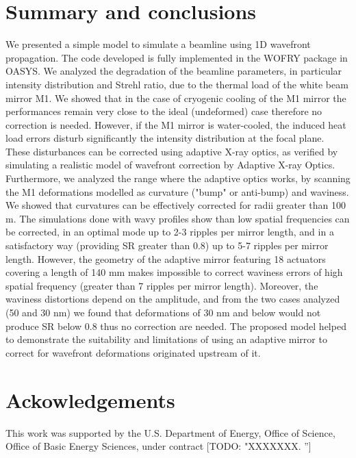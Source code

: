\documentclass[preprint]{iucr}              %
\newcommand{\todo}[1]{{\color{red}[TODO: "#1'']}}
\begin{document}
  

\section{Summary and conclusions}
\label{sec:summary}

We presented a simple model to simulate a beamline using 1D wavefront propagation. The code developed is fully implemented in the WOFRY package in OASYS.
We analyzed the degradation of the beamline parameters, in particular intensity distribution and Strehl ratio, due to the thermal load of the white beam mirror M1. We showed that in the case of cryogenic cooling of the M1 mirror the performances remain very close to the ideal (undeformed) case therefore no correction is needed. However, if the M1 mirror is water-cooled, the induced heat load errors disturb significantly the intensity distribution at the focal plane. These disturbances can be corrected using adaptive X-ray optics, as verified by simulating a realistic model of wavefront correction by Adaptive X-ray Optics. Furthermore, we analyzed the range where the adaptive optics works, by scanning the M1 deformations modelled as curvature ("bump" or anti-bump) and waviness. We showed that curvatures can be effectively corrected for radii greater than 100 m. The simulations done with wavy profiles show than low spatial frequencies can be corrected, in an optimal mode up to 2-3 ripples per mirror length, and in a satisfactory way (providing SR greater than 0.8) up to 5-7 ripples per mirror length. However, the geometry of the adaptive mirror featuring 18 actuators covering a length of 140 mm makes impossible to correct waviness errors of high spatial frequency (greater than 7 ripples per mirror length). Moreover, the waviness distortions depend on the amplitude, and from the two cases analyzed (50 and 30 nm) we found that deformations of 30 nm and below would not produce SR below 0.8 thus no correction are needed. The proposed model helped to demonstrate the suitability and limitations of using an adaptive mirror to correct for wavefront deformations originated upstream of it. 


\section{Ackowledgements}       
 
This work was supported by the U.S. Department of Energy, Office of Science, Office of Basic Energy Sciences, under contract \todo{XXXXXXX. } 

\end{document}
